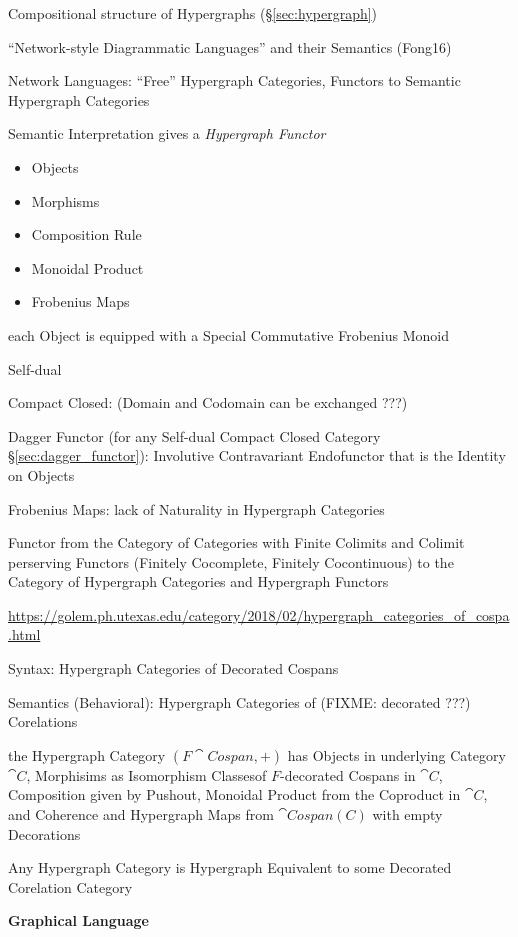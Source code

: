 Compositional structure of Hypergraphs (\S\ref{sec:hypergraph})

``Network-style Diagrammatic Languages'' and their Semantics (Fong16)

Network Languages: ``Free'' Hypergraph Categories,
Functors to Semantic Hypergraph Categories

Semantic Interpretation gives a \emph{Hypergraph Functor}

\begin{itemize}
  \item Objects
  \item Morphisms
  \item Composition Rule
  \item Monoidal Product
  \item Frobenius Maps
\end{itemize}

each Object is equipped with a Special Commutative Frobenius
Monoid

Self-dual

Compact Closed: (Domain and Codomain can be exchanged ???) %

Dagger Functor (for any Self-dual Compact Closed Category
\S\ref{sec:dagger_functor}): Involutive Contravariant Endofunctor that
is the Identity on Objects

Frobenius Maps: lack of Naturality in Hypergraph Categories

Functor from the Category of Categories with Finite Colimits and
Colimit perserving Functors (Finitely Cocomplete, Finitely
Cocontinuous) to the Category of Hypergraph Categories and Hypergraph
Functors

\url{https://golem.ph.utexas.edu/category/2018/02/hypergraph_categories_of_cospa.html}

Syntax: Hypergraph Categories of Decorated Cospans

Semantics (Behavioral): Hypergraph Categories of (FIXME: decorated ???)
Corelations

the Hypergraph Category $(F\cat{Cospan},+)$ has Objects in underlying Category
$\cat{C}$, Morphisims as Isomorphism Classesof $F$-decorated Cospans in
$\cat{C}$, Composition given by Pushout, Monoidal Product from the Coproduct in
$\cat{C}$, and Coherence and Hypergraph Maps from $\cat{Cospan(C)}$ with empty
Decorations

Any Hypergraph Category is Hypergraph Equivalent to some Decorated Corelation
Category


\textbf{Graphical Language}

